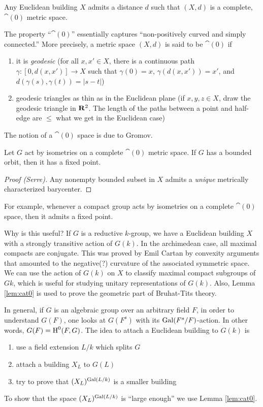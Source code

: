 \documentclass{article}
\begin{document}
\begin{theorem}
Any Euclidean building $X$ admits a distance $d$ such that $(X,d)$ is a 
complete, $\cat(0)$ metric space. 
\end{theorem}

The property ``$\cat(0)$'' essentially captures ``non-positively curved and 
simply connected.'' More precisely, a metric space $(X,d)$ is said to be 
$\cat(0)$ if 
\begin{enumerate}
  \item it is \emph{geodesic} (for all $x,x'\in X$, there is a continuous 
    path $\gamma:[0,d(x,x')] \to X$ such that $\gamma(0)=x$, $\gamma(d(x,x'))=x'$, 
    and $d(\gamma(s),\gamma(t)) = |s-t|$) 
  \item geodesic triangles as thin as in the Euclidean plane (if 
    $x,y,z\in X$, draw the geodesic triangle in $\mathbf{R}^2$. The length of the 
    paths between a point and half-edge are $\leqslant$ what we get in the 
    Euclidean case)
\end{enumerate}

The notion of a $\cat(0)$ space is due to Gromov. 

\begin{lemma}\label{lem:cat0}
Let $G$ act by isometries on a complete $\cat(0)$ metric space. If $G$ has a 
bounded orbit, then it has a fixed point. 
\end{lemma}
\begin{proof}[Proof (Serre)]
Any nonempty bounded subset in $X$ admits a \emph{unique} metrically characterized 
barycenter. 
\end{proof}

For example, whenever a compact group acts by isometries on a complete 
$\cat(0)$ space, then it admits a fixed point. 

Why is this useful? If $G$ is a reductive $k$-group, we have a Euclidean building 
$X$ with a strongly transitive action of $G(k)$. In the archimedean case, 
all maximal compacts are conjugate. This was proved by Emil Cartan by convexity 
arguments that amounted to the negative(?) curvature of the associated symmetric 
space. We can use the action of $G(k)$ on $X$ to classify maximal compact 
subgroups of $Gk$, which is useful for studying unitary representations of $G(k)$. 
Also, Lemma \ref{lem:cat0} is used to prove the geometric part of Bruhat-Tits 
theory. 

In general, if $G$ is an algebraic group over an arbitrary field $F$, in order 
to understand $G(F)$, one looks at $G(F^s)$ with its $\operatorname{Gal}(F^s/F)$-action. 
In other words, $G(F)=\operatorname{H}^0(F,G)$. The idea to attach a Euclidean building to 
$G(k)$ is 
\begin{enumerate}
  \item use a field extension $L/k$ which splits $G$
  \item attach a building $X_L$ to $G(L)$
  \item try to prove that $(X_L)^{\operatorname{Gal}(L/k)}$ is a smaller building
\end{enumerate}
To show that the space $(X_L)^{\operatorname{Gal}(L/k)}$ is ``large enough'' we use 
Lemma \ref{lem:cat0}. 
\end{document}
